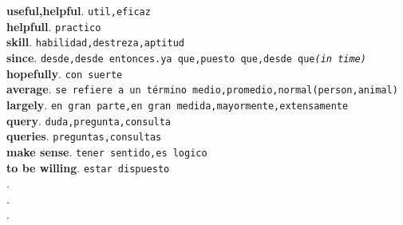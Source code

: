\documentclass[twocolumn]{article}
\begin{document}
	\textsf{\textbf{useful,helpful}}. \texttt{util,eficaz}\\
	\textsf{\textbf{helpfull}}. \texttt{practico}\\
	\textsf{\textbf{skill}}. \texttt{habilidad,destreza,aptitud}\\
	\textsf{\textbf{since}}. \texttt{desde,desde entonces.ya que,puesto que,desde que{\scriptsize \textsl{(in time)}}}\\
	\textsf{\textbf{hopefully}}. \texttt{con suerte}\\
	\textsf{\textbf{average}}. \texttt{se refiere a un t\'ermino medio,promedio,normal(person,animal)}\\
	\textsf{\textbf{largely}}. \texttt{en gran parte,en gran medida,mayormente,extensamente}\\
	\textsf{\textbf{query}}. \texttt{duda,pregunta,consulta}\\
	\textsf{\textbf{queries}}. \texttt{preguntas,consultas}\\
	\textsf{\textbf{make sense}}. \texttt{tener sentido,es logico}\\
	\textsf{\textbf{to be willing}}. \texttt{estar dispuesto}\\
	\textsf{\textbf{}}. \texttt{}\\
	\textsf{\textbf{}}. \texttt{}\\
	\textsf{\textbf{}}. \texttt{}\\
\end{document}

